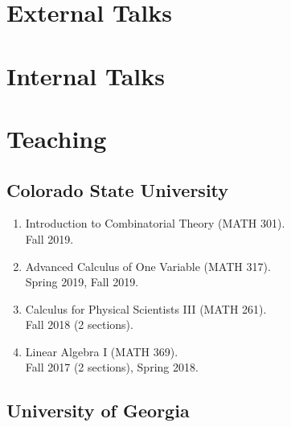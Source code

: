 \documentclass[letterpaper]{article}
\begin{document}

\section*{External Talks}

\nocite{*}
\printbibliography[heading=none,subtype=external,resetnumbers=true]

\section*{Internal Talks}

\nocite{*}
\printbibliography[heading=none,subtype=internal]

\section*{Teaching}

\subsection*{Colorado State University}

\begin{enumerate}
\item Introduction to Combinatorial Theory (MATH 301). \\
  Fall 2019.
\item Advanced Calculus of One Variable (MATH 317). \\
  Spring 2019, Fall 2019.
\item Calculus for Physical Scientists III (MATH 261). \\
  Fall 2018 (2 sections).
\item Linear Algebra I (MATH 369). \\
  Fall 2017 (2 sections), Spring 2018.
\end{enumerate}

\subsection*{University of Georgia}
\end{document}
